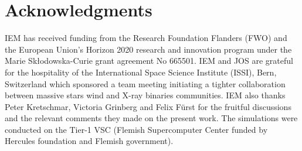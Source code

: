 \documentclass[a4paper,fleqn,usenatbib]{mnras}
\begin{document}
\section*{Acknowledgments}


IEM has received funding from the Research Foundation Flanders (FWO) and the European Union's Horizon 2020 research and innovation program under the Marie Sk\l odowska-Curie grant agreement No 665501. IEM and JOS are grateful for the hospitality of the International Space Science Institute (ISSI), Bern, Switzerland which sponsored a team meeting initiating a tighter collaboration between massive stars wind and X-ray binaries communities. IEM also thanks Peter Kretschmar, Victoria Grinberg and Felix F\"urst for the fruitful discussions and the relevant comments they made on the present work. The simulations were conducted on the Tier-1 VSC (Flemish Supercomputer Center funded by Hercules foundation and Flemish government).





\begin{tiny}

\end{tiny}



\bsp	%
\label{lastpage}
\end{document}
